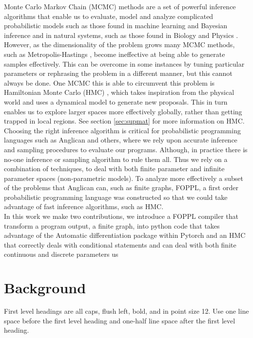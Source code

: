 \documentclass[twoside]{article}
\begin{document}
Monte Carlo Markov Chain (MCMC) methods are a set of powerful inference algorithms \citep{berg2008markov} that enable us to evaluate, model and analyze complicated probabilistic models such as those found in machine learning and Bayesian inference \citep{andrieu2003introduction} and in natural systems, such as those found in Biology \citep{sorensen2007likelihood} and Physics \citep{duane1987hybrid}. 
However, as the dimensionality of the problem grows many MCMC methods, such as Metropolis-Hastings \citep{hastings1970monte},  become ineffective at being able to generate samples effectively. This can be overcome in some instances by tuning particular parameters or rephrasing the problem in a different manner, but this cannot always be done. One MCMC this is able to circumvent this problem is Hamiltonian Monte Carlo (HMC) \citep{neal2011mcmc}\citep{duane1987hybrid}, which takes inspiration from the physical world and uses a dynamical model to generate new proposals. This in turn enables us to explore larger spaces more effectively globally, rather than getting trapped in local regions. See section \ref{sec:supmat} for more information on HMC. \\
Choosing the right inference algorithm is critical for probabilistic programming languages \citep{tolpin2015probabilistic} such as Anglican \citep{wood2014new} and others, where we rely upon accurate inference and sampling procedures to evaluate our programs. Although, in practice there is no-one inference or sampling algorithm to rule them all. Thus we rely on a combination of techniques, to deal with both finite parameter and infinite parameter spaces (non-parametric models). To analyze more effectively a subset of the problems that Anglican can, such as finite graphs, FOPPL, a first order probabilistic programming language was constructed so that we could take advantage of fast inference algorithms, such as HMC.\\
In this work we make two contributions, we introduce a FOPPL compiler that transform a program output, a finite graph, into python code that takes advantage of the Automatic differentiation package within Pytorch \citep{pytorch} and an HMC that correctly deals with conditional statements and can deal with both finite continuous and discrete parameters us


\section{Background}

First level headings are all caps, flush left, bold, and in point size
12. Use one line space before the first level heading and one-half line space
after the first level heading.
\end{document}
